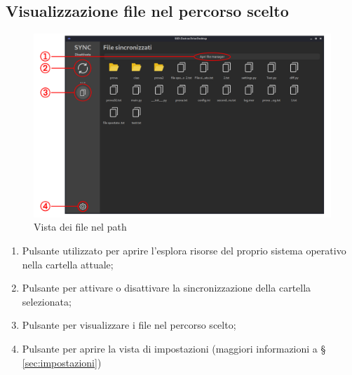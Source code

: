 \subsection{Visualizzazione file nel percorso scelto}
\begin{figure}[H]
    \centering
    \includegraphics[scale = 0.30]{components/img/file-view.png}
    \caption{Vista dei file nel path}
    \label{fig:Vista dei file nel percorso scelto}
\end{figure}
\begin{enumerate}
	\item Pulsante utilizzato per aprire l'esplora risorse del proprio sistema operativo nella cartella attuale;
	\item Pulsante per attivare o disattivare la sincronizzazione della cartella selezionata;
	\item Pulsante per visualizzare i file nel percorso scelto;
	\item Pulsante per aprire la vista di impostazioni (maggiori informazioni a \S{} \ref{sec:impostazioni})
\end{enumerate}

